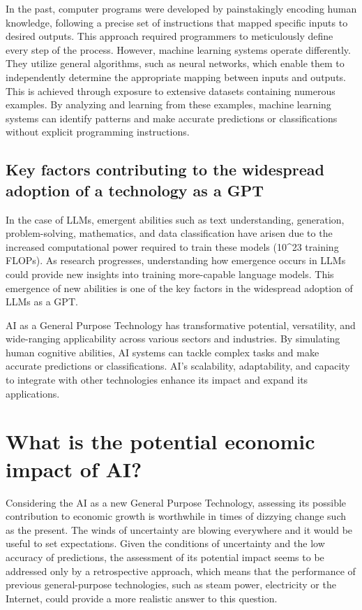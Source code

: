 \documentclass[preprint, 1p,
authoryear]{elsarticle} %
\begin{document}
In the past, computer programs were developed by painstakingly encoding
human knowledge, following a precise set of instructions that mapped
specific inputs to desired outputs. This approach required programmers
to meticulously define every step of the process. However, machine
learning systems operate differently. They utilize general algorithms,
such as neural networks, which enable them to independently determine
the appropriate mapping between inputs and outputs. This is achieved
through exposure to extensive datasets containing numerous examples. By
analyzing and learning from these examples, machine learning systems can
identify patterns and make accurate predictions or classifications
without explicit programming instructions.

\hypertarget{key-factors-contributing-to-the-widespread-adoption-of-a-technology-as-a-gpt}{%
\subsection{Key factors contributing to the widespread adoption of a
technology as a
GPT}\label{key-factors-contributing-to-the-widespread-adoption-of-a-technology-as-a-gpt}}

In the case of LLMs, emergent abilities such as text understanding,
generation, problem-solving, mathematics, and data classification have
arisen due to the increased computational power required to train these
models (10\^{}23 training FLOPs). As research progresses, understanding
how emergence occurs in LLMs could provide new insights into training
more-capable language models. This emergence of new abilities is one of
the key factors in the widespread adoption of LLMs as a GPT.

AI as a General Purpose Technology has transformative potential,
versatility, and wide-ranging applicability across various sectors and
industries. By simulating human cognitive abilities, AI systems can
tackle complex tasks and make accurate predictions or classifications.
AI's scalability, adaptability, and capacity to integrate with other
technologies enhance its impact and expand its applications.

\hypertarget{what-is-the-potential-economic-impact-of-ai}{%
\section{What is the potential economic impact of
AI?}\label{what-is-the-potential-economic-impact-of-ai}}

Considering the AI as a new General Purpose Technology, assessing its
possible contribution to economic growth is worthwhile in times of
dizzying change such as the present. The winds of uncertainty are
blowing everywhere and it would be useful to set expectations. Given the
conditions of uncertainty and the low accuracy of predictions, the
assessment of its potential impact seems to be addressed only by a
retrospective approach, which means that the performance of previous
general-purpose technologies, such as steam power, electricity or the
Internet, could provide a more realistic answer to this question.
\end{document}
